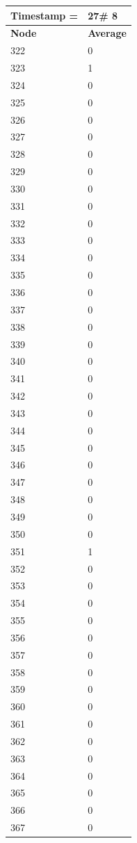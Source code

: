 \begin{tabular}{|l||l|}
\hline
\textbf{Timestamp =} & \textbf{27}\# 8\\\hline
	\textbf{Node} & \textbf{Average} \\ \hline
\hline
	322 & 0 \\ \hline
	323 & 1 \\ \hline
	324 & 0 \\ \hline
	325 & 0 \\ \hline
	326 & 0 \\ \hline
	327 & 0 \\ \hline
	328 & 0 \\ \hline
	329 & 0 \\ \hline
	330 & 0 \\ \hline
	331 & 0 \\ \hline
	332 & 0 \\ \hline
	333 & 0 \\ \hline
	334 & 0 \\ \hline
	335 & 0 \\ \hline
	336 & 0 \\ \hline
	337 & 0 \\ \hline
	338 & 0 \\ \hline
	339 & 0 \\ \hline
	340 & 0 \\ \hline
	341 & 0 \\ \hline
	342 & 0 \\ \hline
	343 & 0 \\ \hline
	344 & 0 \\ \hline
	345 & 0 \\ \hline
	346 & 0 \\ \hline
	347 & 0 \\ \hline
	348 & 0 \\ \hline
	349 & 0 \\ \hline
	350 & 0 \\ \hline
	351 & 1 \\ \hline
	352 & 0 \\ \hline
	353 & 0 \\ \hline
	354 & 0 \\ \hline
	355 & 0 \\ \hline
	356 & 0 \\ \hline
	357 & 0 \\ \hline
	358 & 0 \\ \hline
	359 & 0 \\ \hline
	360 & 0 \\ \hline
	361 & 0 \\ \hline
	362 & 0 \\ \hline
	363 & 0 \\ \hline
	364 & 0 \\ \hline
	365 & 0 \\ \hline
	366 & 0 \\ \hline
	367 & 0 \\ \hline
\end{tabular}
